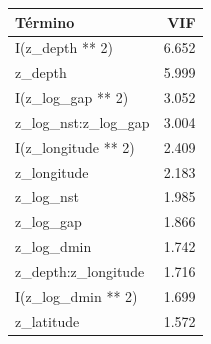 \begin{tabular}{lr}
\toprule
Término & VIF \\
\midrule
I(z\_depth ** 2) & 6.652 \\
z\_depth & 5.999 \\
I(z\_log\_gap ** 2) & 3.052 \\
z\_log\_nst:z\_log\_gap & 3.004 \\
I(z\_longitude ** 2) & 2.409 \\
z\_longitude & 2.183 \\
z\_log\_nst & 1.985 \\
z\_log\_gap & 1.866 \\
z\_log\_dmin & 1.742 \\
z\_depth:z\_longitude & 1.716 \\
I(z\_log\_dmin ** 2) & 1.699 \\
z\_latitude & 1.572 \\
\bottomrule
\end{tabular}
